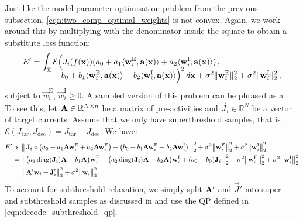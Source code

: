 Just like the model parameter optimisation problem from the previous subsection, \cref{eqn:two_comp_optimal_weights} is not convex.
Again, we work around this by multiplying with the denominator inside the square to obtain a substitute loss function:
\begin{align}
	\begin{aligned}
	E' &=
		\int_{\mathbb{X}} \mathcal{E}
		\Bigl(
			J_i(f(\mathbf{x})) (a_0 + a_1 \langle \mathbf{w}^\mathrm{E}_i, \mathbf{a}(\mathbf{x}) \rangle + a_2 \langle \mathbf{w}^\mathrm{I}_i, \mathbf{a}(\mathbf{x}) \rangle )\,, \\[-1em]
		&\hspace{3.66em}		
		b_0 + b_1 \langle \mathbf{w}^\mathrm{E}_i, \mathbf{a}(\mathbf{x}) \rangle - b_2 \langle \mathbf{w}^\mathrm{I}_i, \mathbf{a}(\mathbf{x}) \rangle
		\Bigr)^2 \, d\mathbf{x}
		 + \sigma^2 \| \mathbf{w}^\mathrm{E}_i \|^2_2 + \sigma^2 \| \mathbf{w}^\mathrm{I}_i \|^2_2 \,,
	\end{aligned}
	\label{eqn:two_comp_optimal_weights_prime}
\end{align}
subject to $\vec w^\mathrm{E}_i$, $\vec w^\mathrm{I}_i \geq 0$.
A sampled version of this problem can be phrased as a \qprog.
To see this, let $\mathbf{A} \in \mathbb{R}^{N \times n}$ be a matrix of pre-activities and $\vec J_i \in \mathbb{R}^{N}$ be a vector of target currents.
Assume that we only have superthreshold samples, that is $\mathcal{E}(J_\mathrm{tar}, J_\mathrm{dec}) = J_\mathrm{tar} - J_\mathrm{dec}$. We have:
\begin{align}
	E' &\propto \bigl\|	\,
		  \mathbf{J}_i \circ
		  	\bigl(
		  		a_0 +
		  		a_1 \mathbf{A} \mathbf{w}_i^\mathrm{E} +
		  		a_2 \mathbf{A} \mathbf{w}_i^\mathrm{E} \bigr)
	      - \bigl(
	      		b_0 +
	      		b_1 \mathbf{A} \mathbf{w}_i^\mathrm{E} -
	      		b_2 \mathbf{A} \mathbf{w}_i^\mathrm{I} \bigr)
	\, \bigr\|_2^2
	+ \sigma^2 \bigl\| \mathbf{w}^\mathrm{E}_i \bigr\|^2_2 + \sigma^2 \bigl\| \mathbf{w}^\mathrm{I}_i \bigr\|^2_2 \notag \\
		&= \hspace{0.125em} \bigl\|
			\bigl(a_1 \operatorname{\mathrm{diag}}(\mathbf{J}_i) \mathbf{A} - b_1 \mathbf{A} \bigr) \mathbf{w}_i^\mathrm{E}
			+ \bigl(a_2 \operatorname{\mathrm{diag}}(\mathbf{J}_i) \mathbf{A} + b_2 \mathbf{A} \bigr) \mathbf{w}_i^\mathrm{I}
			+ (a_0 - b_0) \mathbf{J}_i
	\, \bigr\|_2^2
	+ \sigma^2 \bigl\| \mathbf{w}^\mathrm{E}_i \bigr\|^2_2 
	+ \sigma^2 \bigl\| \mathbf{w}^\mathrm{I}_i \bigr\|^2_2  \notag \\
	&= \hspace{0.125em} \bigl\|
		\mathbf{A}' \mathbf{w}_i + \mathbf{J}_i'
	\bigr\|_2^2
	+ \sigma^2 \bigl\| \mathbf{w}_i \bigr\|^2_2  \,.
	\label{eqn:two_comp_optimal_weights_prime_matrix}
\end{align}
To account for subthreshold relaxation, we simply split $\mathbf{A}'$ and $\vec J'$ into super- and subthreshold samples as discussed in  and use the QP defined in \cref{eqn:decode_subthreshold_qp}.

